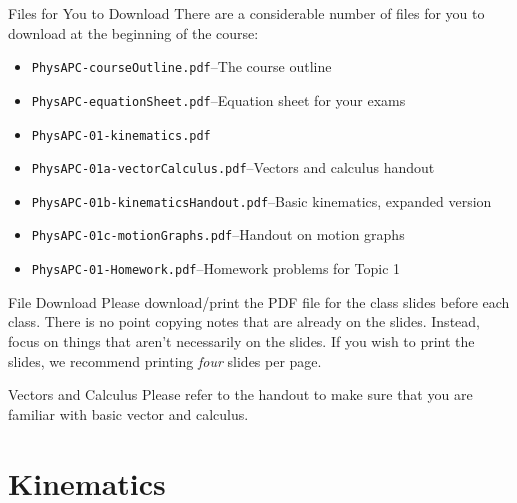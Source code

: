 \documentclass[12pt,compress,aspectratio=169]{beamer}
\begin{document}
\begin{frame}
  \titlepage
\end{frame}



\begin{frame}{Files for You to Download}
  There are a considerable number of files for you to download at the beginning
  of the course:
  \begin{itemize}
  \item\texttt{PhysAPC-courseOutline.pdf}--The course outline
  \item\texttt{PhysAPC-equationSheet.pdf}--Equation sheet for your exams
  \item\texttt{PhysAPC-01-kinematics.pdf}
  \item\texttt{PhysAPC-01a-vectorCalculus.pdf}--Vectors and calculus handout
  \item\texttt{PhysAPC-01b-kinematicsHandout.pdf}--Basic kinematics, expanded
    version
  \item\texttt{PhysAPC-01c-motionGraphs.pdf}--Handout on motion graphs
  \item\texttt{PhysAPC-01-Homework.pdf}--Homework problems for Topic 1
  \end{itemize}
\end{frame}


\begin{frame}{File Download}
  Please download/print the PDF file for the class slides before
  each class. There is no point copying notes that are already on the slides.
  Instead, focus on things that aren't necessarily on the slides. If you wish
  to print the slides, we recommend printing \emph{four} slides per page.
\end{frame}



\begin{frame}{Vectors and Calculus}
  Please refer to the handout to make sure that you are familiar with
  basic vector and calculus.
\end{frame}



\section{Kinematics}
\end{document}

